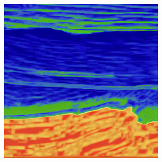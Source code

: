 \documentclass[
]{article}
\begin{document}
\begin{figure}
\begin{minipage}{0.50\linewidth}
\begin{figure}[H]
{}


\end{figure}%

\end{minipage}%
\newline
\begin{minipage}{0.50\linewidth}

\begin{figure}[H]

{\centering \includegraphics[width=0.9\textwidth,height=\textheight]{./figs/gen8W.png}

}


\end{figure}%

\end{minipage}%
%
\begin{minipage}{0.50\linewidth}

\begin{figure}[H]


\end{figure}
\end{minipage}
\end{figure}
\end{document}
